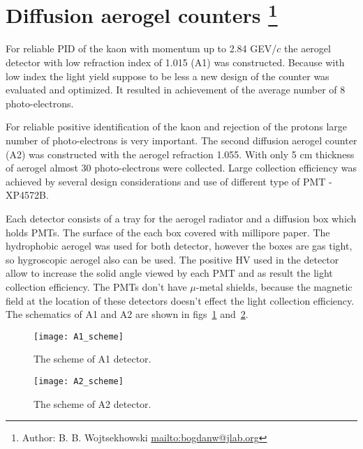 {\section[Diffusion aerogel counters]{Diffusion aerogel counters 
\footnote{Author: B. B. Wojtsekhowski \url{mailto:bogdanw@jlab.org}}
}

For reliable PID of the kaon with momentum up to 2.84 GEV/$c$ 
the aerogel detector with low refraction index of 1.015 (A1) was constructed.
Because with low index the light yield suppose to be less a new design
of the counter was evaluated and optimized. It resulted in
achievement of the average number of 8 photo-electrons. 

For reliable positive identification of the kaon and rejection of the protons 
large number of photo-electrons is very important. The second  diffusion
aerogel counter (A2) was constructed with the aerogel refraction 1.055. 
With only 5 cm thickness of aerogel almost 30 photo-electrons were collected. 
Large collection efficiency was achieved by several design considerations and
use of different type of PMT - XP4572B.

Each detector consists of a tray for the aerogel radiator and a diffusion box
which holds PMTs. The surface of the each box covered with millipore
paper. The hydrophobic aerogel was used for both detector, however the boxes
are gas tight, so hygroscopic aerogel also can be used. The positive HV 
used in the detector allow to increase the solid angle viewed by each PMT
and as result the light collection efficiency. The PMTs don't have
$\mu$-metal shields, because the magnetic field at the location of these
detectors  doesn't effect the light collection efficiency.
The schematics of A1 and A2 are shown in figs~\ref{fig:A1_scheme} 
and~\ref{fig:A2_scheme}.

\begin{figure}[htb]
\begin{center}
  \texttt{[image: A1\_scheme]}
\end{center}
\caption[The scheme of A1 detector] {The scheme of A1 detector.}
\label{fig:A1_scheme}
\end{figure}
%
\begin{figure}[htb]
\begin{center}
  \texttt{[image: A2\_scheme]}
\end{center}
\caption[The scheme of A2 detector] {The scheme of A2 detector.}
\label{fig:A2_scheme}
\end{figure}
%
%
} %

